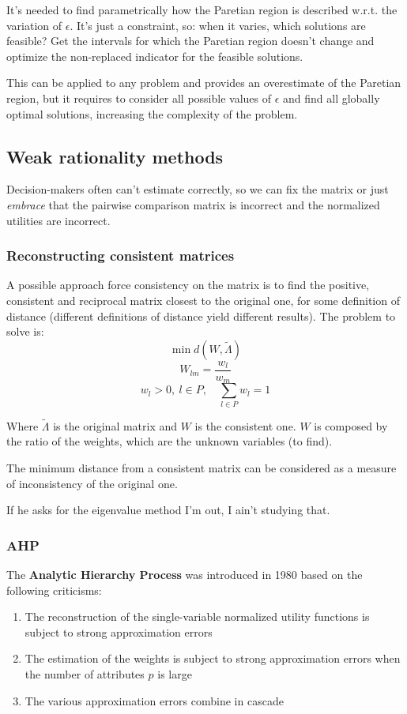 It's needed to find parametrically how the Paretian region is described w.r.t. the variation of $\epsilon$. It's just a constraint, so: when it varies, which solutions are feasible? Get the intervals for which the Paretian region doesn't change and optimize the non-replaced indicator for the feasible solutions.

This can be applied to any problem and provides an overestimate of the Paretian region, but it requires to consider all possible values of $\epsilon$ and find all globally optimal solutions, increasing the complexity of the problem. 

\subsection{Weak rationality methods}

Decision-makers often can't estimate correctly, so we can fix the matrix or just \textit{embrace} that the pairwise comparison matrix is incorrect and the normalized utilities are incorrect.

\subsubsection{Reconstructing consistent matrices}

A possible approach force consistency on the matrix is to find the positive, consistent and reciprocal matrix closest to the original one, for some definition of distance (different definitions of distance yield different results). The problem to solve is: 
$$ \min d \left(W, \tilde \Lambda \right)$$
$$ W_{lm} = \frac{w_l}{w_m} $$
$$ w_l > 0, \ l \in P, \quad \sum_{l \in P} w_l = 1$$

Where $\tilde \Lambda$ is the original matrix and $W$ is the consistent one. $W$ is composed by the ratio of the weights, which are the unknown variables (to find).

The minimum distance from a consistent matrix can be considered as a measure of inconsistency of the original one.

If he asks for the eigenvalue method I'm out, I ain't studying that.

\subsubsection{AHP}

The \textbf{Analytic Hierarchy Process} was introduced in 1980 based on the following criticisms:
\begin{enumerate}
	\item The reconstruction of the single-variable normalized utility functions is subject to strong approximation errors
	
	\item The estimation of the weights is subject to strong approximation errors when the number of attributes $p$ is large
	
	\item The various approximation errors combine in cascade
\end{enumerate}

